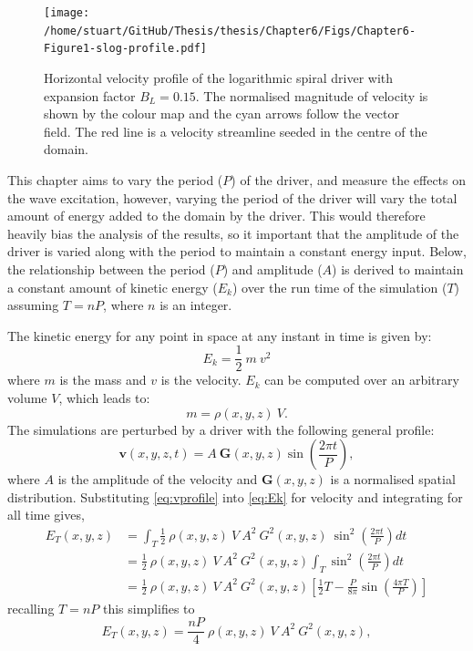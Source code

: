 \documentclass[a4paper,12pt,fourier,authoryear,custommargin]{Classes/PhDThesisPSnPDF}
\renewcommand{\vec}{\mathbf}
\begin{document}
\begin{figure}[h]
    \centering
    \texttt{[image: /home/stuart/GitHub/Thesis/thesis/Chapter6/Figs/Chapter6-Figure1-slog-profile.pdf]}
    \caption{Horizontal velocity profile of the logarithmic spiral driver with expansion factor $B_L = 0.15$. The normalised magnitude of velocity is shown by the colour map and the cyan arrows follow the vector field. The red line is a velocity streamline seeded in the centre of the domain.}
    \label{fig:slog-profile}
\end{figure}

This chapter aims to vary the period ($P$) of the driver, and measure the effects on the wave excitation, however, varying the period of the driver will vary the total amount of energy added to the domain by the driver.
This would therefore heavily bias the analysis of the results, so it important that the amplitude of the driver is varied along with the period to maintain a constant energy input.
Below, the relationship between the period ($P$) and amplitude ($A$) is derived to maintain a constant amount of kinetic energy ($E_k$) over the run time of the simulation ($T$) assuming $T = nP$, where $n$ is an integer.

The kinetic energy for any point in space at any instant in time is given by:
\begin{equation}
    E_k = \frac{1}{2}\ m\ v^2\label{eq:Ek}
\end{equation}
where $m$ is the mass and $v$ is the velocity.
$E_k$ can be computed over an arbitrary volume $V$, which leads to:
\begin{equation}
    m = \rho(x,y,z)\ V.\label{eq:mass}
\end{equation}
The simulations are perturbed by a driver with the following general profile:
\begin{equation}
    \vec{v}(x,y,z,t) = A\ \vec{G}(x,y,z) \sin \left( \frac{2\pi t}{P} \right),\label{eq:vprofile}
  \end{equation}
where $A$ is the amplitude of the velocity and $\vec{G}(x,y,z)$ is a normalised spatial distribution.
Substituting \cref{eq:vprofile} into \cref{eq:Ek} for velocity and integrating for all time gives,
\begin{align}
    E_{T}(x,y,z) &= \int_T \frac{1}{2}\ \rho(x,y,z)\ V\ A^2\ G^2(x,y,z)\ \sin^2\left(\frac{2\pi t}{P} \right) dt \\
    &= \frac{1}{2}\ \rho(x,y,z)\ V\ A^2\ G^2(x,y,z) \int_T \sin^2\left(\frac{2\pi t}{P} \right) dt \\
    & = \frac{1}{2}\ \rho(x,y,z)\ V\ A^2\ G^2(x,y,z) \left[ \frac{1}{2}T - \frac{P}{8\pi} \sin \left(\frac{4\pi T}{P} \right) \right]
\end{align}
recalling $T = nP$ this simplifies to 
\begin{equation}
    E_{T}(x,y,z) = \frac{nP}{4}\ \rho(x,y,z)\ V\ A^2\ G^2(x,y,z), \label{eq:Et_xyz}
\end{equation}
\end{document}
